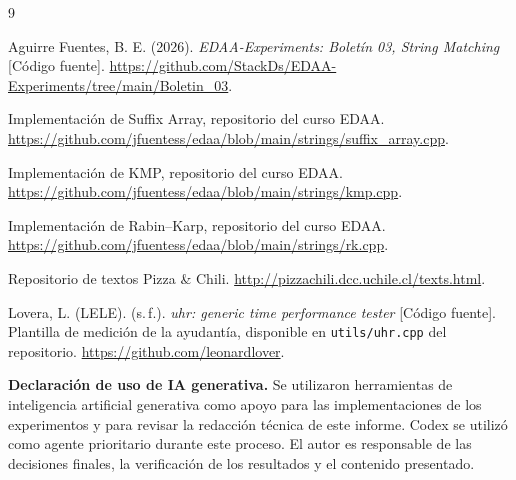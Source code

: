 \begin{thebibliography}{9}
{}

Aguirre Fuentes, B. E. (2026).
\textit{EDAA-Experiments: Boletín 03, String Matching} [Código fuente].
\url{https://github.com/StackDs/EDAA-Experiments/tree/main/Boletin_03}.

Implementación de Suffix Array, repositorio del curso EDAA.
\url{https://github.com/jfuentess/edaa/blob/main/strings/suffix_array.cpp}.

Implementación de KMP, repositorio del curso EDAA.
\url{https://github.com/jfuentess/edaa/blob/main/strings/kmp.cpp}.

Implementación de Rabin--Karp, repositorio del curso EDAA.
\url{https://github.com/jfuentess/edaa/blob/main/strings/rk.cpp}.

Repositorio de textos Pizza \& Chili.
\url{http://pizzachili.dcc.uchile.cl/texts.html}.

Lovera, L. (LELE). (s.\,f.).
\textit{uhr: generic time performance tester} [Código fuente].
Plantilla de medición de la ayudantía, disponible en
\texttt{utils/uhr.cpp} del repositorio.
\url{https://github.com/leonardlover}.

\par\medskip
\noindent\textbf{Declaración de uso de IA generativa.}
Se utilizaron herramientas de inteligencia artificial generativa como apoyo para las implementaciones de los experimentos y para revisar la redacción técnica de este informe. Codex se utilizó como agente prioritario durante este proceso. El autor es responsable de las decisiones finales, la verificación de los resultados y el contenido presentado.

\end{thebibliography}
